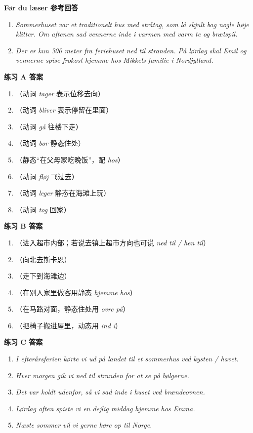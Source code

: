 \begin{answerbox}
\textbf{Før du læser 参考回答}
\begin{enumerate}
  \item \textit{Sommerhuset var et traditionelt hus med stråtag, som lå skjult bag nogle høje klitter. Om aftenen sad vennerne inde i varmen med varm te og brætspil.}
  \item \textit{Der er kun 300 meter fra feriehuset ned til stranden. På lørdag skal Emil og vennerne spise frokost hjemme hos Mikkels familie i Nordjylland.}
\end{enumerate}

\textbf{练习 A 答案}
\begin{enumerate}
  \item {}（动词 \textit{tager} 表示位移去向）
  \item {}（动词 \textit{bliver} 表示停留在里面）
  \item {}（动词 \textit{gå} 往楼下走）
  \item {}（动词 \textit{bor} 静态住处）
  \item {}（静态“在父母家吃晚饭”，配 \textit{hos}）
  \item {}（动词 \textit{fløj} 飞过去）
  \item {}（动词 \textit{leger} 静态在海滩上玩）
  \item {}（动词 \textit{tog} 回家）
\end{enumerate}

\textbf{练习 B 答案}
\begin{enumerate}
  \item {}（进入超市内部；若说去镇上超市方向也可说 \textit{ned til / hen til}）
  \item {}（向北去斯卡恩）
  \item {}（走下到海滩边）
  \item {}（在别人家里做客用静态 \textit{hjemme hos}）
  \item {}（在马路对面，静态住处用 \textit{ovre på}）
  \item {}（把椅子搬进屋里，动态用 \textit{ind i}）
\end{enumerate}

\textbf{练习 C 答案}
\begin{enumerate}
  \item \textit{I efterårsferien kørte vi ud på landet til et sommerhus ved kysten / havet.}
  \item \textit{Hver morgen gik vi ned til stranden for at se på bølgerne.}
  \item \textit{Det var koldt udenfor, så vi sad inde i huset ved brændeovnen.}
  \item \textit{Lørdag aften spiste vi en dejlig middag hjemme hos Emma.}
  \item \textit{Næste sommer vil vi gerne køre op til Norge.}
\end{enumerate}


\end{answerbox}
